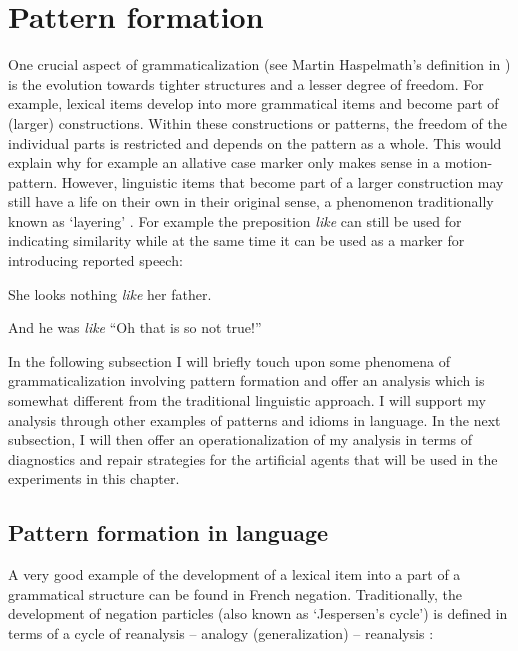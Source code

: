 \section{Pattern formation}
\label{s:pattern-formation}

One crucial aspect of grammaticalization (see Martin Haspelmath's definition in ) is the evolution towards tighter structures and a lesser degree of freedom. For example, lexical items develop into more grammatical items and become part of (larger) constructions. Within these constructions or patterns, the freedom of the individual parts is restricted and depends on the pattern as a whole. This would explain why for example an allative case marker only makes sense in a motion-pattern. However, linguistic items that become part of a larger construction may still have a life on their own in their original sense, a phenomenon traditionally known as `layering' \citep[124--126]{hopper93grammaticalization}. For example the preposition {\em like} can still be used for indicating similarity while at the same time it can be used as a marker for introducing reported speech:

\ea
She looks nothing {\em like} her father.
\item And he was {\em like} ``Oh that is so not true!''
\z

In the following subsection I will briefly touch upon some phenomena of grammaticalization involving pattern formation and offer an analysis which is somewhat different from the traditional linguistic approach. I will support my analysis through other examples of patterns and idioms in language. In the next subsection, I will then offer an operationalization of my analysis in terms of diagnostics and repair strategies for the artificial agents that will be used in the experiments in this chapter.



\subsection{Pattern formation in language}

A very good example of the development of a lexical item into a part of a grammatical structure can be found in French negation. Traditionally, the development of negation particles (also known as `Jespersen's cycle') is defined in terms of a cycle of reanalysis -- analogy (generalization) -- reanalysis \cite[65--66]{hopper93grammaticalization}:

